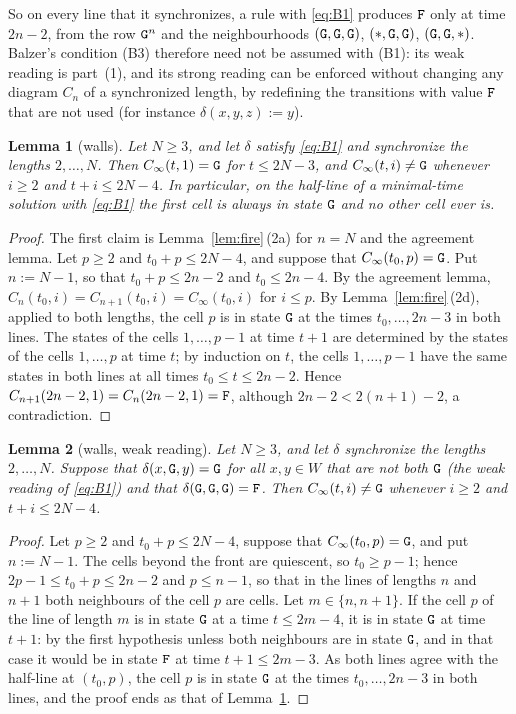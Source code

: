 \documentclass[11pt]{article}
\newtheorem{lemma}{Lemma}
\theoremstyle{remark}
\begin{document}
So on every line that it synchronizes, a rule with \eqref{eq:B1} produces $\mathtt{F}$ only at time $2n-2$, from the row
$\mathtt{G}^n$ and the neighbourhoods $(\mathtt{G},\mathtt{G},\mathtt{G})$, $(\ast,\mathtt{G},\mathtt{G})$, $(\mathtt{G},\mathtt{G},\ast)$. Balzer's condition (B3)
therefore need not be assumed with (B1): its weak reading is part~(1), and its strong reading can be enforced
without changing any diagram $C_n$ of a synchronized length, by redefining the transitions with value $\mathtt{F}$
that are not used (for instance $\delta(x,y,z):=y$).

\begin{lemma}[walls]\label{lem:wall}
Let $N\ge3$, and let $\delta$ satisfy \eqref{eq:B1} and synchronize the lengths $2,\dots,N$. Then
$C_\infty(t,1)=\mathtt{G}$ for $t\le 2N-3$, and $C_\infty(t,i)\ne\mathtt{G}$ whenever $i\ge2$ and $t+i\le 2N-4$. In
particular, on the half-line of a minimal-time solution with \eqref{eq:B1} the first cell is always in state
$\mathtt{G}$ and no other cell ever is.
\end{lemma}

\begin{proof}
The first claim is Lemma~\ref{lem:fire}\,(2a) for $n=N$ and the agreement lemma. Let $p\ge2$ and
$t_0+p\le 2N-4$, and suppose that $C_\infty(t_0,p)=\mathtt{G}$. Put $n:=N-1$, so that $t_0+p\le 2n-2$ and
$t_0\le 2n-4$. By the agreement lemma, $C_n(t_0,i)=C_{n+1}(t_0,i)=C_\infty(t_0,i)$ for $i\le p$. By
Lemma~\ref{lem:fire}\,(2d), applied to both lengths, the cell $p$ is in state $\mathtt{G}$ at the times
$t_0,\dots,2n-3$ in both lines. The states of the cells $1,\dots,p-1$ at time $t+1$ are determined by the
states of the cells $1,\dots,p$ at time $t$; by induction on $t$, the cells $1,\dots,p-1$ have the same states
in both lines at all times $t_0\le t\le 2n-2$. Hence $C_{n+1}(2n-2,1)=C_n(2n-2,1)=\mathtt{F}$, although
$2n-2<2(n+1)-2$, a contradiction.
\end{proof}

\begin{lemma}[walls, weak reading]\label{lem:wallweak}
Let $N\ge3$, and let $\delta$ synchronize the lengths $2,\dots,N$. Suppose that $\delta(x,\mathtt{G},y)=\mathtt{G}$ for all
$x,y\in W$ that are not both $\mathtt{G}$ (the weak reading of \eqref{eq:B1}) and that
$\delta(\mathtt{G},\mathtt{G},\mathtt{G})=\mathtt{F}$. Then $C_\infty(t,i)\ne\mathtt{G}$ whenever $i\ge2$ and $t+i\le 2N-4$.
\end{lemma}

\begin{proof}
Let $p\ge2$ and $t_0+p\le 2N-4$, suppose that $C_\infty(t_0,p)=\mathtt{G}$, and put $n:=N-1$. The cells beyond the
front are quiescent, so $t_0\ge p-1$; hence $2p-1\le t_0+p\le 2n-2$ and $p\le n-1$, so that in the lines of
lengths $n$ and $n+1$ both neighbours of the cell $p$ are cells. Let $m\in\{n,n+1\}$. If the cell $p$ of the
line of length $m$ is in state $\mathtt{G}$ at a time $t\le 2m-4$, it is in state $\mathtt{G}$ at time $t+1$: by the first
hypothesis unless both neighbours are in state $\mathtt{G}$, and in that case it would be in state $\mathtt{F}$ at time
$t+1\le 2m-3$. As both lines agree with the half-line at $(t_0,p)$, the cell $p$ is in state $\mathtt{G}$ at the times
$t_0,\dots,2n-3$ in both lines, and the proof ends as that of Lemma~\ref{lem:wall}.
\end{proof}
\end{document}
